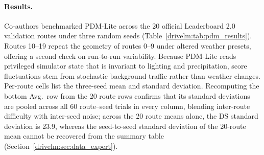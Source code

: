 \paragraph{Results.}
Co-authors benchmarked PDM-Lite across the 20 official Leaderboard 2.0 validation routes under three random seeds (Table~\ref{drivelm:tab:pdm_results}). Routes 10--19 repeat the geometry of routes 0--9 under altered weather presets, offering a second check on run-to-run variability. Because PDM-Lite reads privileged simulator state that is invariant to lighting and precipitation, score fluctuations stem from stochastic background traffic rather than weather changes. Per-route cells list the three-seed mean and standard deviation. Recomputing the bottom Avg.\ row from the 20 route rows confirms that its standard deviations are pooled across all 60 route--seed trials in every column, blending inter-route difficulty with inter-seed noise; across the 20 route means alone, the DS standard deviation is 23.9, whereas the seed-to-seed standard deviation of the 20-route mean cannot be recovered from the summary table (Section~\ref{drivelm:sec:data_expert}).

